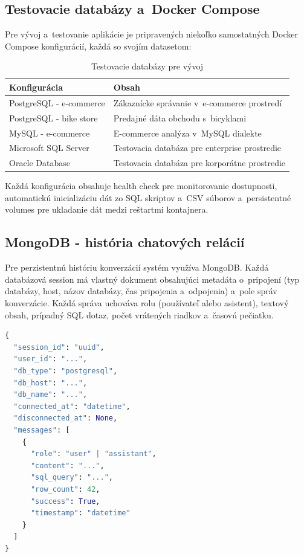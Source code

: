 \documentclass[a4paper, 12pt]{article}
\begin{document}
\subsection{Testovacie databázy a~Docker Compose}

Pre vývoj a~testovanie aplikácie je pripravených niekoľko samostatných Docker Compose konfigurácií, každá so svojím datasetom:

\begin{table}[H]
\centering
\begin{tabular}{ll}
\toprule
\textbf{Konfigurácia} & \textbf{Obsah} \\
\midrule
PostgreSQL - e-commerce & Zákaznícke správanie v~e-commerce prostredí \\
PostgreSQL - bike store & Predajné dáta obchodu s~bicyklami \\
MySQL - e-commerce & E-commerce analýza v~MySQL dialekte \\
Microsoft SQL Server & Testovacia databáza pre enterprise prostredie \\
Oracle Database & Testovacia databáza pre korporátne prostredie \\
\bottomrule
\end{tabular}
\caption{Testovacie databázy pre vývoj}
\end{table}

Každá konfigurácia obsahuje health check pre monitorovanie dostupnosti, automatickú inicializáciu dát zo SQL skriptov a~CSV súborov a~persistentné volumes pre ukladanie dát medzi reštartmi kontajnera.
\clearpage
\subsection{MongoDB - história chatových relácií}

Pre perzistentnú históriu konverzácií systém využíva MongoDB. Každá databázová session má vlastný dokument obsahujúci metadáta o~pripojení (typ databázy, host, názov databázy, čas pripojenia a~odpojenia) a~pole správ konverzácie. Každá správa uchováva rolu (používateľ alebo asistent), textový obsah, prípadný SQL dotaz, počet vrátených riadkov a~časovú pečiatku.

\begin{lstlisting}[language=Python, caption={štruktúra MongoDB session}]
{
  "session_id": "uuid",
  "user_id": "...",
  "db_type": "postgresql",
  "db_host": "...",
  "db_name": "...",
  "connected_at": "datetime",
  "disconnected_at": None,
  "messages": [
    {
      "role": "user" | "assistant",
      "content": "...",
      "sql_query": "...",
      "row_count": 42,
      "success": True,
      "timestamp": "datetime"
    }
  ]
}
\end{lstlisting}
\end{document}
